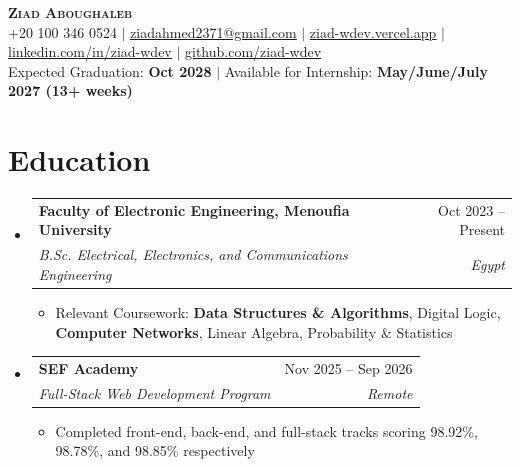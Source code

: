 \documentclass[letterpaper,11pt]{article}
\makeatletter
\newcommand{\resumeItem}[1]{
  \item\small{
    {#1 \vspace{-2pt}}
  }
}
\newcommand{\resumeSubheading}[4]{
  \vspace{-2pt}\item
  \begin{tabular*}{0.97\textwidth}[t]{l@{\extracolsep{\fill}}r}
    \textbf{#1} & #2 \\
    \textit{\small#3} & \textit{\small #4} \\
  \end{tabular*}\vspace{-7pt}
}
\newcommand{\resumeSubHeadingListStart}{\begin{itemize}[leftmargin=0.15in, label={}]}
\newcommand{\resumeSubHeadingListEnd}{\end{itemize}}
\newcommand{\resumeItemListStart}{\begin{itemize}}
\newcommand{\resumeItemListEnd}{\end{itemize}\vspace{-5pt}}
\makeatother
\begin{document}
\begin{center}
  \textbf{\Huge \scshape Ziad Aboughaleb} \\ \vspace{1pt}
  \small +20 100 346 0524 $|$ \href{mailto:ziadahmed2371@gmail.com}{\underline{ziadahmed2371@gmail.com}} $|$
  \href{https://ziad-wdev.vercel.app}{\underline{ziad-wdev.vercel.app}} $|$
  \href{https://linkedin.com/in/ziad-wdev}{\underline{linkedin.com/in/ziad-wdev}} $|$
  \href{https://github.com/ziad-wdev}{\underline{github.com/ziad-wdev}} \\ \vspace{2pt}
  \small Expected Graduation: \textbf{Oct 2028} $|$ Available for Internship: \textbf{May/June/July 2027 (13+ weeks)}
\end{center}

\section{Education}
  \resumeSubHeadingListStart
    \resumeSubheading
      {Faculty of Electronic Engineering, Menoufia University}{Oct 2023 -- Present}
      {B.Sc. Electrical, Electronics, and Communications Engineering}{Egypt}
      \resumeItemListStart
        \resumeItem{Relevant Coursework: \textbf{Data Structures \& Algorithms}, Digital Logic, \textbf{Computer Networks}, Linear Algebra, Probability \& Statistics}
      \resumeItemListEnd
    \resumeSubheading
      {SEF Academy}{Nov 2025 -- Sep 2026}
      {Full-Stack Web Development Program}{Remote}
      \resumeItemListStart
        \resumeItem{Completed front-end, back-end, and full-stack tracks scoring 98.92\%, 98.78\%, and 98.85\% respectively}
      \resumeItemListEnd
  \resumeSubHeadingListEnd

\end{document}
